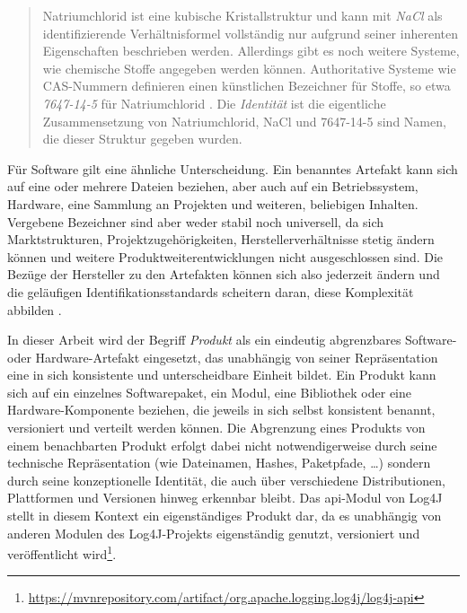 \begin{quote}
    Natriumchlorid ist eine kubische Kristallstruktur und kann mit \textit{NaCl} als identifizierende Verhältnisformel vollständig nur aufgrund seiner inherenten Eigenschaften beschrieben werden.
    Allerdings gibt es noch weitere Systeme, wie chemische Stoffe angegeben werden können.
    Authoritative Systeme wie CAS-Nummern definieren einen künstlichen Bezeichner für Stoffe, so etwa \textit{7647-14-5} für Natriumchlorid \autocite{Huebner_2003}.
    Die \textit{Identität} ist die eigentliche Zusammensetzung von Natriumchlorid, NaCl und 7647-14-5 sind Namen, die dieser Struktur gegeben wurden.
\end{quote}

Für Software gilt eine ähnliche Unterscheidung.
Ein benanntes Artefakt kann sich auf eine oder mehrere Dateien beziehen, aber auch auf ein Betriebssystem, Hardware, eine Sammlung an Projekten und weiteren, beliebigen Inhalten.
Vergebene Bezeichner sind aber weder stabil noch universell, da sich Marktstrukturen, Projektzugehörigkeiten, Herstellerverhältnisse stetig ändern können und weitere Produktweiterentwicklungen nicht ausgeschlossen sind.
Die Bezüge der Hersteller zu den Artefakten können sich also jederzeit ändern und die geläufigen Identifikationsstandards scheitern daran, diese Komplexität abbilden \autocite{Manion_Proell_Schmidt2023}.

In dieser Arbeit wird der Begriff \textit{Produkt} als ein eindeutig abgrenzbares Software- oder Hardware-Artefakt eingesetzt, das unabhängig von seiner Repräsentation eine in sich konsistente und unterscheidbare Einheit bildet.
Ein Produkt kann sich auf ein einzelnes Softwarepaket, ein Modul, eine Bibliothek oder eine Hardware-Komponente beziehen, die jeweils in sich selbst konsistent benannt, versioniert und verteilt werden können.
Die Abgrenzung eines Produkts von einem benachbarten Produkt erfolgt dabei nicht notwendigerweise durch seine technische Repräsentation (wie Dateinamen, Hashes, Paketpfade, \ldots) sondern durch seine konzeptionelle Identität, die auch über verschiedene Distributionen, Plattformen und Versionen hinweg erkennbar bleibt.
Das \acrshort{api}-Modul von Log4J stellt in diesem Kontext ein eigenständiges Produkt dar, da es unabhängig von anderen Modulen des Log4J-Projekts eigenständig genutzt, versioniert und veröffentlicht wird\footnote{\url{https://mvnrepository.com/artifact/org.apache.logging.log4j/log4j-api}}.

